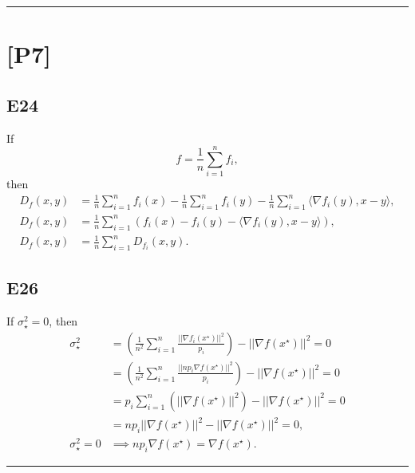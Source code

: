 \documentclass[12pt]{article}
\begin{document}
\hrule
\vspace{0.1cm}
\section*{[P7]}
\subsection*{E24}
If
\begin{equation*}
    f = \frac{1}{n} \sum^n_{i=1}f_i,
\end{equation*}
then
\begin{equation*}
    \begin{split}
        D_f(x, y) &= \frac{1}{n} \sum^n_{i=1} f_i(x) - 
                \frac{1}{n} \sum^n_{i=1} f_i(y) - 
                \frac{1}{n} \sum^n_{i=1} \langle \nabla f_i(y), x-y \rangle, \\
        D_f(x, y) &= \frac{1}{n} \sum^n_{i=1} (f_i(x) - f_i(y) - \langle \nabla f_i(y), x-y \rangle), \\
        D_f(x, y) &= \frac{1}{n} \sum^n_{i=1} D_{f_i}(x, y).
    \end{split}
\end{equation*}
\subsection*{E26}
If $\sigma^2_\star = 0$, then
\begin{equation*}
    \begin{split}
        \sigma^2_\star &= \left(\frac{1}{n^2} \sum_{i=1}^n \frac{||\nabla f_i(x^\star)||^2}{p_i}\right) - ||\nabla f(x^\star)||^2 = 0 \\
        &= \left(\frac{1}{n^2} \sum_{i=1}^n \frac{||np_i \nabla f(x^\star)||^2}{p_i}\right) - ||\nabla f(x^\star)||^2 = 0\\
        &= p_i \sum_{i=1}^n (|| \nabla f(x^\star) ||^2) - ||\nabla f(x^\star)||^2 = 0\\
        &= np_i || \nabla f(x^\star) ||^2 - ||\nabla f(x^\star)||^2 = 0, \\
        \sigma^2_\star = 0 &\implies np_i \nabla f(x^\star) = \nabla f(x^\star).
    \end{split}
\end{equation*}
\vspace{0.1cm}

\hrule
\vspace{0.1cm}
\end{document}

